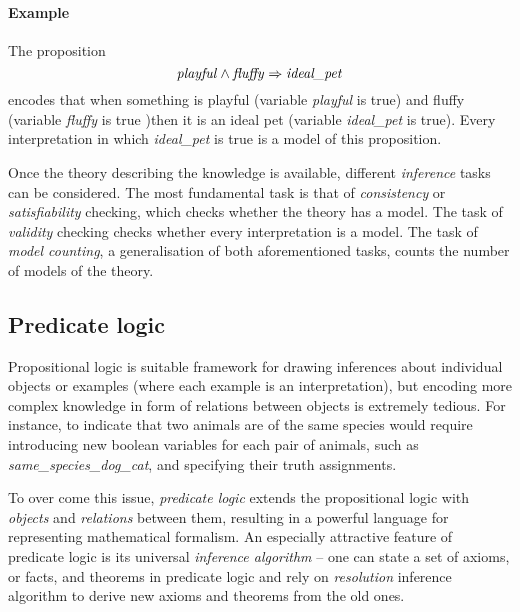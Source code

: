 \paragraph{Example} The proposition 
$$\text{\textit{playful}} \wedge \text{\textit{fluffy}} \Rightarrow \text{\textit{ideal\_pet}} $$
encodes that when something is playful (variable \textit{playful} is true) and fluffy (variable \textit{fluffy} is true )then it is an ideal pet (variable \textit{ideal\_pet} is true).
Every interpretation in which \textit{ideal\_pet} is true is a model of this proposition.




Once the theory describing the knowledge is available, different \textit{inference} tasks can be considered.
The most fundamental task is that of \textit{consistency} or \textit{satisfiability} checking, which checks whether the theory has a model.
The task of \textit{validity} checking checks whether every interpretation is a model.
The task of \textit{model counting}, a generalisation of both aforementioned tasks, counts the number of models of the theory.









\subsection{Predicate logic}


Propositional logic is suitable framework for drawing inferences about individual objects or examples (where each example is an interpretation), but encoding more complex knowledge in form of relations between objects is extremely tedious.
For instance, to indicate that two animals are of the same species would require introducing new boolean variables for each pair of animals, such as \textit{same\_species\_dog\_cat}, and specifying their truth assignments.



To over come this issue, \textit{predicate logic} extends the propositional logic with \textit{objects} and \textit{relations} between them, resulting in a powerful language for representing mathematical formalism.
An especially attractive feature of predicate logic is its universal \textit{inference algorithm} -- one can state a set of axioms, or facts, and theorems in predicate logic and rely on \textit{resolution} \cite{Robinson:1965:Resolution} inference algorithm to derive new axioms and theorems from the old ones.



